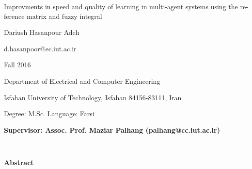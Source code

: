 \thispagestyle{empty}

\begin{latin}
\begin{center}

{\Huge Improvments in speed and quality of learning in multi-agent systems using the reference matrix and fuzzy integral}

\vspace{1cm}

{\LARGE{Dariush Hasanpour Adeh}}

\vspace{0.2cm}

{\small d.hasanpoor@ec.iut.ac.ir}

\vspace{0.5cm}

Fall 2016

\vspace{0.5cm}

Department of Electrical and Computer Engineering

\vspace{0.2cm}

Isfahan University of Technology, Isfahan 84156-83111, Iran

\vspace{0.2cm}

Degree: M.Sc. \hspace*{3cm} Language: Farsi

\vspace{1cm}

{\small\textbf{Supervisor: Assoc. Prof. Maziar Palhang (palhang@cc.iut.ac.ir)}}
\end{center}
~\vfill



\noindent\textbf{Abstract}


\end{latin}
